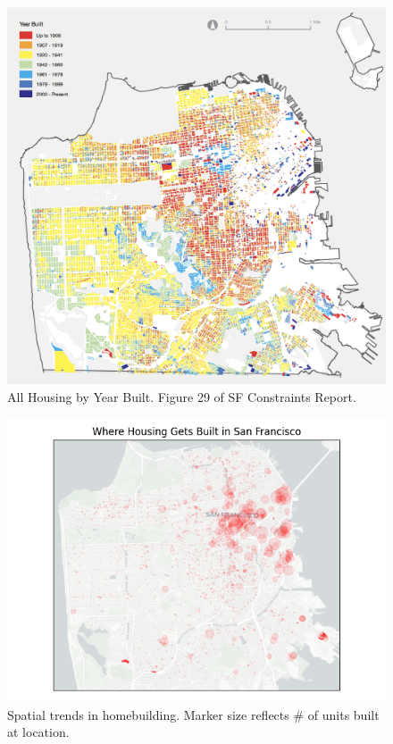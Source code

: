 \documentclass[a4paper,12pt]{article}
\begin{document}
\begin{figure}[hbtp]
    \centering
    \includegraphics[scale=.6]{figures/age.png}
    \caption{All Housing by Year Built. Figure 29 of SF Constraints Report.\cite{SFHousingElement2022}}
    \label{fig:age}
\end{figure}

\begin{figure}[hbt]
    \centering
    \includegraphics[scale=.85]{figures/where_housing_gets_built.png}
    \caption{Spatial trends in homebuilding. Marker size reflects \# of units built at location.}
    \label{fig:eda_spatial_trend}
\end{figure}
\end{document}
